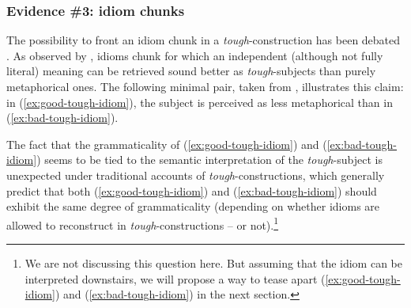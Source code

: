 \documentclass[11pt]{article}
\begin{document}
\subsubsection{Evidence \#3: idiom chunks}
The possibility to front an idiom chunk in a \textit{tough}-construction has been debated \cite{Lasnik1974,Rezac2006,Hicks2009}. As observed by \cite{Longenbaugh2017}, idioms chunk for which an independent (although not fully literal) meaning can be retrieved sound better as \textit{tough}-subjects than purely metaphorical ones. The following minimal pair, taken from \cite{Longenbaugh2017}, illustrates this claim: in (\ref{ex:good-tough-idiom}), the subject is perceived as less metaphorical than in (\ref{ex:bad-tough-idiom}).
\begin{exe}
	\ex 
	\begin{xlist}
		\label{ex:good-tough-idiom}
		\label{ex:bad-tough-idiom}
	\end{xlist}\label{ex:tough-idioms}
\end{exe}
The fact that the grammaticality of (\ref{ex:good-tough-idiom}) and  (\ref{ex:bad-tough-idiom}) seems to be tied to the semantic interpretation of the \textit{tough}-subject is unexpected under traditional accounts of \textit{tough}-constructions, which generally predict that both (\ref{ex:good-tough-idiom}) and (\ref{ex:bad-tough-idiom}) should exhibit the same degree of grammaticality (depending on whether idioms are allowed to reconstruct in \textit{tough}-constructions -- or not).\footnote{We are not discussing this question here. But assuming that the idiom can be interpreted downstairs, we will propose a way to tease apart (\ref{ex:good-tough-idiom}) and (\ref{ex:bad-tough-idiom}) in the next section.}
\end{document}
